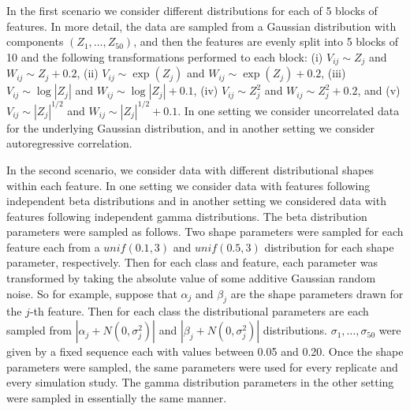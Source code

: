 In the first scenario we consider different distributions for each of 5 blocks
of features.  In more detail, the data are sampled from a Gaussian distribution
with components $(Z_1, \dots, Z_{50})$, and then the features are evenly split
into 5 blocks of 10 and the following transformations performed to each block:
(i) $V_{ij} \sim Z_j$ and $W_{ij} \sim Z_j + 0.2$, (ii) $V_{ij} \sim \exp(Z_j)$
and $W_{ij} \sim \exp(Z_j) + 0.2$, (iii) $V_{ij} \sim \log |Z_j|$ and
$W_{ij} \sim \log |Z_j| + 0.1$, (iv) $V_{ij} \sim Z_j^2$ and
$W_{ij} \sim Z_j^2 + 0.2$, and (v) $V_{ij} \sim |Z_j|^{1/2}$ and
$W_{ij} \sim |Z_j|^{1/2} + 0.1$.  In one setting we consider uncorrelated data
for the underlying Gaussian distribution, and in another setting we consider
autoregressive correlation.

In the second scenario, we consider data with different distributional shapes
within each feature.  In one setting we consider data with features following
independent beta distributions and in another setting we considered data with
features following independent gamma distributions.  The beta distribution
parameters were sampled as follows.  Two shape parameters were sampled for each
feature each from a $\mathit{unif}(0.1, 3)$ and $\mathit{unif}(0.5, 3)$
distribution for each shape parameter, respectively.  Then for each class and
feature, each parameter was transformed by taking the absolute value of some
additive Gaussian random noise.  So for example, suppose that $\alpha_j$ and
$\beta_j$ are the shape parameters drawn for the $j$-th feature.  Then for each
class the distributional parameters are each sampled from
$|\alpha_j + N(0, \sigma_j^2)|$ and $|\beta_j + N(0, \sigma_j^2)|$
distributions.  $\sigma_1, \dots, \sigma_{50}$ were given by a fixed sequence
each with values between 0.05 and 0.20.  Once the shape parameters were sampled,
the same parameters were used for every replicate and every simulation study.
The gamma distribution parameters in the other setting were sampled in
essentially the same manner.

